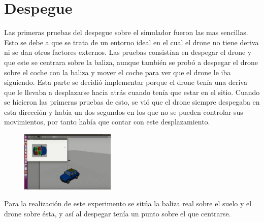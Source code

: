 \section{Despegue}

\hspace{1cm} Las primeras pruebas del despegue sobre el simulador fueron las mas sencillas. Esto se debe a que se trata de un entorno ideal en el cual el drone no tiene deriva ni se dan otros factores externos. Las pruebas consist\'ian en despegar el drone y que este se centrara sobre la baliza, aunque tambi\'en se prob\'o a despegar el drone sobre el coche con la baliza y mover el coche para ver que el drone le iba siguiendo. Esta parte se decidi\'o implementar porque el drone ten\'ia una deriva que le llevaba a desplazarse hacia atr\'as cuando ten\'ia que estar en el sitio. Cuando se hicieron las primeras pruebas de esto, se vi\'o que el drone siempre despegaba en esta direcci\'on y hab\'ia un dos segundos en los que no se pueden controlar sus movimientos, por tanto hab\'ia que contar con este desplazamiento.
\begin{figure}[H]
	\centering
		\includegraphics[width=0.4\textwidth]{imgs/TakeOff.jpg}
	\label{fig:Despegue sobre la baliza del coche.}
\end{figure}


\hspace{1cm} Para la realizaci\'on de este experimento se sit\'ua la baliza real sobre el suelo y el drone sobre \'esta, y as\'i al despegar ten\'ia un punto sobre el que centrarse. 

